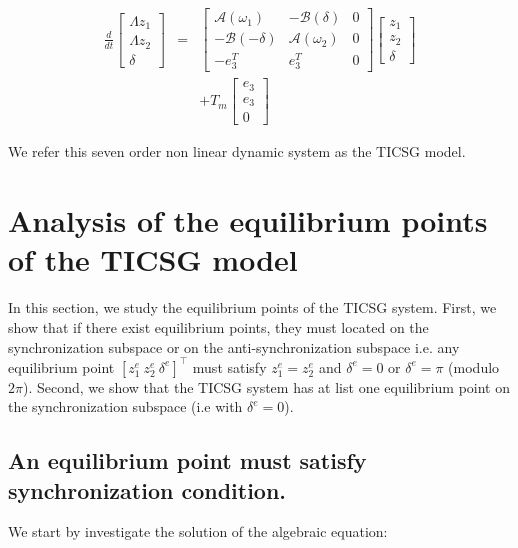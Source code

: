 \documentclass[letterpaper, 10 pt, conference]{ieeeconf}  %
\begin{document}
\begin{equation}
\begin{array}{ccc}
\frac{d}{dt}\left[\begin{array}{c}
\varLambda z_{1}\\
\varLambda z_{2}\\
\delta
\end{array}\right] & = & \left[\begin{array}{c|c|c}
\mathcal{A}(\omega_{1}) & -\mathcal{B}(\delta) & 0\\
\hline -\mathcal{B}(-\delta) & \mathcal{A}(\omega_{2}) & 0\\
\hline -e_{3}^{T} & e_{3}^{T} & 0
\end{array}\right]\left[\begin{array}{c}
z_{1}\\
z_{2}\\
\delta
\end{array}\right]\\
 &  & +T_{m}\left[\begin{array}{c}
e_{3}\\
e_{3}\\
0
\end{array}\right]
\end{array}\label{eq:TICSGDynamics}
\end{equation}

We refer this seven order non linear dynamic system as the TICSG model.

\section{Analysis of the equilibrium points of the TICSG model \label{sec:equivalence_pont}}

In this section, we study the equilibrium points of the TICSG system. First, we show that  if there exist equilibrium points, they must located on the synchronization subspace or on the anti-synchronization subspace i.e. any equilibrium point $\left[z_1^e \ z_2^e \ \delta^e \right]^\top$ must satisfy $z_1^e=z_2^e$ and $\delta^e=0$ or $\delta^e = \pi$   (modulo $2\pi$). Second, we show that the TICSG system has at list one equilibrium point on the synchronization subspace (i.e with $\delta^e=0$).

\subsection{An equilibrium point must satisfy synchronization condition.}
We  start by investigate the solution of the algebraic equation:  
\end{document}
